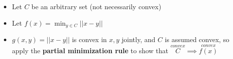 \documentclass{article}
\begin{document}
\begin{headered_note}
  \begin{itemize}
    \item Let $C$ be an arbitrary set (not necessarily convex)
    \item Let $f(x)=\min_{y\in C}||x-y||$
    \item $g(x,y)=||x-y||$ is convex in $x,y$ jointly, and $C$ is assumed
          convex, so apply the \textbf{partial minimization rule} to show
          that $\stackrel{convex}{C}\implies \stackrel{convex}{f(x)}$
  \end{itemize}
\end{headered_note}
\end{document}
